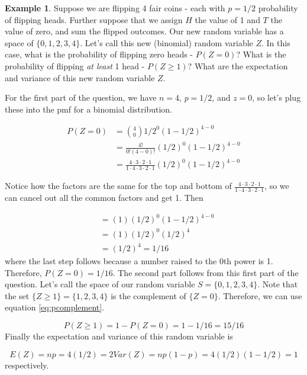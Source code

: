 \documentclass[
]{book}
\theoremstyle{definition}
\theoremstyle{definition}
\newtheorem{example}{Example}[chapter]
\theoremstyle{definition}
\theoremstyle{definition}
\theoremstyle{remark}
\begin{document}
\begin{example}
Suppose we are flipping 4 fair coins - each with \(p=1/2\) probability of flipping heads. Further suppose that we assign \(H\) the value of 1 and \(T\) the value of zero, and sum the flipped outcomes. Our new random variable has a space of \(\{0,1,2,3,4\}\). Let's call this new (binomial) random variable \(Z\). In this case, what is the probability of flipping zero heads - \(P(Z = 0)\)? What is the probability of flipping \emph{at least} 1 head - \(P(Z \geq 1)\)? What are the expectation and variance of this new random variable \(Z\).

For the first part of the question, we have \(n = 4\), \(p = 1/2\), and \(z = 0\), so let's plug these into the pmf for a binomial distribution.

\begin{align}
P(Z = 0) &= {4 \choose 0} 1/2^0(1-1/2)^{4-0} \\
&= \frac{4!}{0!(4-0)!}(1/2)^0(1-1/2)^{4-0} \\
&= \frac{4 \cdot 3 \cdot 2 \cdot 1}{1 \cdot 4 \cdot 3 \cdot 2 \cdot 1}(1/2)^0(1-1/2)^{4-0}
\end{align}

Notice how the factors are the same for the top and bottom of \(\frac{4 \cdot 3 \cdot 2 \cdot 1}{1 \cdot 4 \cdot 3 \cdot 2 \cdot 1}\), so we can cancel out all the common factors and get 1. Then

\begin{align}
&= (1)(1/2)^0(1-1/2)^{4-0} \\
&= (1)(1/2)^0(1/2)^{4} \\
&= (1/2)^{4} = 1/16
\end{align}
where the last step follows because a number raised to the 0th power is 1. Therefore, \(P(Z = 0) = 1/16\). The second part follows from this first part of the question. Let's call the space of our random variable \(S = \{0,1,2,3,4\}\). Note that the set \(\{Z \geq 1\} = \{1,2,3,4\}\) is the complement of \(\{Z = 0\}\). Therefore, we can use equation \eqref{eq:pcomplement}.

\[
P(Z \geq 1) = 1 - P(Z = 0) = 1 - 1/16 = 15/16
\]
Finally the expectation and variance of this random variable is

\[
E(Z) = np = 4(1/2) = 2
Var(Z) = np(1-p) = 4(1/2)(1-1/2) = 1
\]
respectively.
\end{example}
\end{document}

